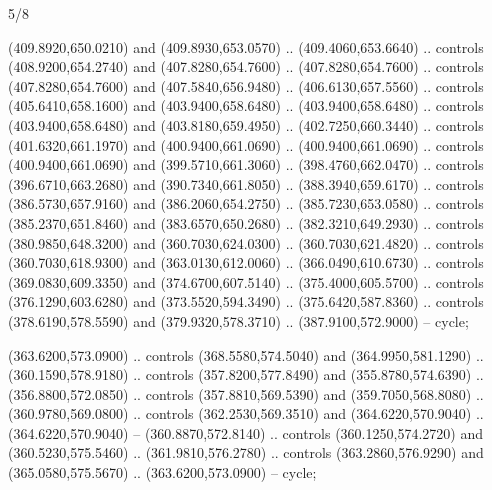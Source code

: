 \begin{flagdescription}{5/8}
\begin{scope}[shift={(m)}]
\begin{scope}[scale=\flagwidth/220,y=0.1mm, x=0.1mm, yscale=-1,shift={(-596,-360)}]
\begin{scope}[cm={{-1.0,0.0,0.0,1.0,(1193.9797,0.0)}}]
\begin{scope}[draw=black,line join=round,line cap=round,line width=0.381\lw]
\begin{scope}[fill=white,line width=1.143\lw]
  (409.8920,650.0210) and (409.8930,653.0570) .. (409.4060,653.6640) .. controls
  (408.9200,654.2740) and (407.8280,654.7600) .. (407.8280,654.7600) .. controls
  (407.8280,654.7600) and (407.5840,656.9480) .. (406.6130,657.5560) .. controls
  (405.6410,658.1600) and (403.9400,658.6480) .. (403.9400,658.6480) .. controls
  (403.9400,658.6480) and (403.8180,659.4950) .. (402.7250,660.3440) .. controls
  (401.6320,661.1970) and (400.9400,661.0690) .. (400.9400,661.0690) .. controls
  (400.9400,661.0690) and (399.5710,661.3060) .. (398.4760,662.0470) .. controls
  (396.6710,663.2680) and (390.7340,661.8050) .. (388.3940,659.6170) .. controls
  (386.5730,657.9160) and (386.2060,654.2750) .. (385.7230,653.0580) .. controls
  (385.2370,651.8460) and (383.6570,650.2680) .. (382.3210,649.2930) .. controls
  (380.9850,648.3200) and (360.7030,624.0300) .. (360.7030,621.4820) .. controls
  (360.7030,618.9300) and (363.0130,612.0060) .. (366.0490,610.6730) .. controls
  (369.0830,609.3350) and (374.6700,607.5140) .. (375.4000,605.5700) .. controls
  (376.1290,603.6280) and (373.5520,594.3490) .. (375.6420,587.8360) .. controls
  (378.6190,578.5590) and (379.9320,578.3710) .. (387.9100,572.9000) -- cycle;

 (363.6200,573.0900) .. controls (368.5580,574.5040) and
  (364.9950,581.1290) .. (360.1590,578.9180) .. controls (357.8200,577.8490) and
  (355.8780,574.6390) .. (356.8800,572.0850) .. controls (357.8810,569.5390) and
  (359.7050,568.8080) .. (360.9780,569.0800) .. controls (362.2530,569.3510) and
  (364.6220,570.9040) .. (364.6220,570.9040) -- (360.8870,572.8140) .. controls
  (360.1250,574.2720) and (360.5230,575.5460) .. (361.9810,576.2780) .. controls
  (363.2860,576.9290) and (365.0580,575.5670) .. (363.6200,573.0900) -- cycle;


\end{scope}
\end{scope}
\end{scope}
\end{scope}
\end{scope}
\end{flagdescription}
